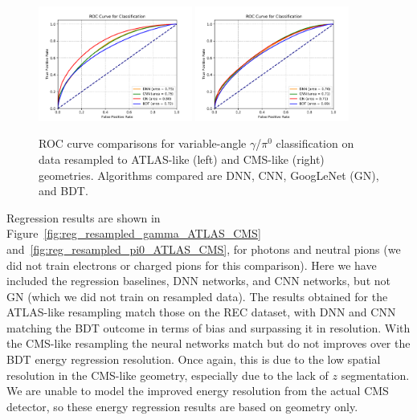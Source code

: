 \begin{figure}[htbp]
    \centering
    \includegraphics[width=0.45\textwidth]{Images/Calo/classification_ROC_ATLAS.pdf}
    \includegraphics[width=0.45\textwidth]{Images/Calo/classification_ROC_CMS.pdf}
    \caption{ROC curve comparisons for variable-angle $\gamma$/$\pi^0$ classification on data resampled to ATLAS-like (left) and CMS-like (right) geometries. Algorithms compared are DNN, CNN, GoogLeNet (GN), and BDT.}
    \label{fig:class_ROC_ATLAS_CMS}
\end{figure}

Regression results are shown in Figure~\ref{fig:reg_resampled_gamma_ATLAS_CMS} and~\ref{fig:reg_resampled_pi0_ATLAS_CMS}, for photons and neutral pions (we did not train electrons or charged pions for this comparison). Here we have included the regression baselines, DNN networks, and CNN networks, but not GN (which we did not train on resampled data). The results obtained for the ATLAS-like resampling match those on the REC dataset, with DNN and CNN matching the BDT outcome in terms of bias and surpassing it in resolution. With the CMS-like resampling the neural networks match but do not improves over the BDT energy regression resolution. Once again, this is due to the low spatial resolution in the CMS-like geometry, especially due to the lack of $z$ segmentation. We are unable to model the improved energy resolution from the actual CMS detector, so these energy regression results are based on geometry only.

